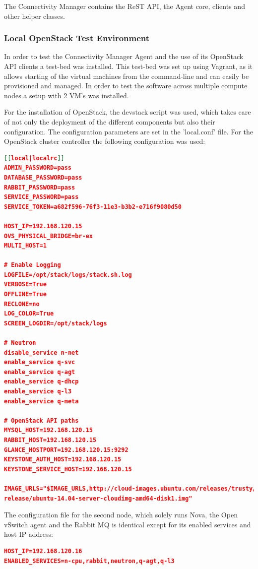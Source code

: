 The Connectivity Manager contains the ReST API, the Agent core, clients and other helper classes.

\subsubsection{Local OpenStack Test Environment}

In order to test the Connectivity Manager Agent and the use of its OpenStack API clients a test-bed was installed. This test-bed was set up using Vagrant, as it allows starting of the virtual machines from the command-line and can easily be provisioned and managed. In order to test the software across multiple compute nodes a setup with 2 VM's was installed.

For the installation of OpenStack, the devstack script was used, which takes care of not only the deployment of the different components but also their configuration. The configuration parameters are set in the 'local.conf' file. For the OpenStack cluster controller the following configuration was used:

\begin{lstlisting}[language=json]
[[local|localrc]]
ADMIN_PASSWORD=pass
DATABASE_PASSWORD=pass
RABBIT_PASSWORD=pass
SERVICE_PASSWORD=pass
SERVICE_TOKEN=a682f596-76f3-11e3-b3b2-e716f9080d50

HOST_IP=192.168.120.15
OVS_PHYSICAL_BRIDGE=br-ex
MULTI_HOST=1

# Enable Logging
LOGFILE=/opt/stack/logs/stack.sh.log
VERBOSE=True
OFFLINE=True
RECLONE=no
LOG_COLOR=True
SCREEN_LOGDIR=/opt/stack/logs

# Neutron
disable_service n-net
enable_service q-svc
enable_service q-agt
enable_service q-dhcp
enable_service q-l3
enable_service q-meta

# OpenStack API paths
MYSQL_HOST=192.168.120.15
RABBIT_HOST=192.168.120.15
GLANCE_HOSTPORT=192.168.120.15:9292
KEYSTONE_AUTH_HOST=192.168.120.15
KEYSTONE_SERVICE_HOST=192.168.120.15

IMAGE_URLS="$IMAGE_URLS,http://cloud-images.ubuntu.com/releases/trusty/
release/ubuntu-14.04-server-cloudimg-amd64-disk1.img"
\end{lstlisting}

The configuration file for the second node, which solely runs Nova, the Open vSwitch agent and the Rabbit MQ is identical except for its enabled services and host IP address:

\begin{lstlisting}[language=json]
HOST_IP=192.168.120.16
ENABLED_SERVICES=n-cpu,rabbit,neutron,q-agt,q-l3
\end{lstlisting}

